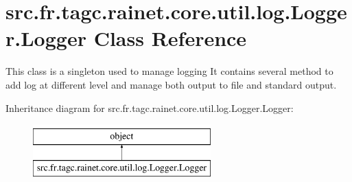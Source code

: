 \hypertarget{classsrc_1_1fr_1_1tagc_1_1rainet_1_1core_1_1util_1_1log_1_1Logger_1_1Logger}{\section{src.\-fr.\-tagc.\-rainet.\-core.\-util.\-log.\-Logger.\-Logger Class Reference}
\label{classsrc_1_1fr_1_1tagc_1_1rainet_1_1core_1_1util_1_1log_1_1Logger_1_1Logger}
}


This class is a singleton used to manage logging It contains several method to add log at different level and manage both output to file and standard output.  


Inheritance diagram for src.\-fr.\-tagc.\-rainet.\-core.\-util.\-log.\-Logger.\-Logger\-:\begin{figure}[H]
\begin{center}
\leavevmode
\includegraphics[height=2.000000cm]{classsrc_1_1fr_1_1tagc_1_1rainet_1_1core_1_1util_1_1log_1_1Logger_1_1Logger}
\end{center}
\end{figure}
